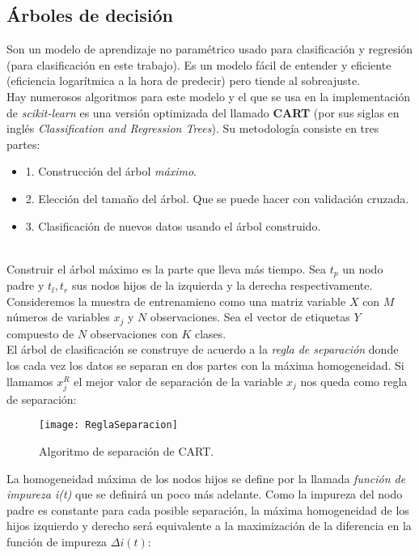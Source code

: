 \subsection{Árboles de decisión}
Son un modelo de aprendizaje no paramétrico usado para clasificación y regresión (para clasificación en este trabajo). Es un modelo fácil de entender y eficiente (eficiencia logarítmica a la hora de predecir) pero tiende al sobreajuste. \cite{scikit2021dt}\\
Hay numerosos algoritmos para este modelo y el que se usa en la implementación de \textit{scikit-learn} es una versión optimizada del llamado \textbf{CART} (por sus siglas en inglés \textit{Classification and Regression Trees}). Su metodología consiste en tres partes:
\begin{itemize}
 \item 1. Construcción del árbol \textit{máximo}.
 \item 2. Elección del tamaño del árbol. Que se puede hacer con validación cruzada. \cite{timofeev2004classification}
 \item 3. Clasificación de nuevos datos usando el árbol construido.
\end{itemize}
\cite{timofeev2004classification}\\
Construir el árbol máximo es la parte que lleva más tiempo. Sea $t_{p}$ un nodo padre y $t_{l},t_{r}$ sus nodos hijos de la izquierda y la derecha respectivamente. Consideremos la muestra de entrenamieno como una matriz variable $X$ con $M$ números de variables $x_{j}$ y $N$ observaciones. Sea el vector de etiquetas $Y$ compuesto de $N$ observaciones con $K$ clases.\\
El árbol de clasificación se construye de acuerdo a la \textit{regla de separación} donde los cada vez los datos se separan en dos partes con la máxima homogeneidad. Si llamamos $x_{j}^{R}$ el mejor valor de separación de la variable $x_{j}$ nos queda como regla de separación:
\begin{figure}[H]
  \centering
  \texttt{[image: ReglaSeparacion]}
  \caption{Algoritmo de separación de CART. \cite{timofeev2004classification}}
  \label{fig:k-nn-example}
\end{figure}
\begin{center}
\end{center}
La homogeneidad máxima de los nodos hijos se define por la llamada \textit{función de impureza i(t)} que se definirá un poco más adelante. Como la impureza del nodo padre es constante para cada posible separación, la máxima homogeneidad de los hijos izquierdo y derecho será equivalente a la maximización de la diferencia en la función de impureza $\Delta i(t)$:
